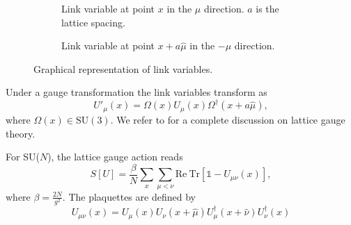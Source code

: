 \documentclass[12pt,a4paper]{article}
\begin{document}
\begin{figure}
\begin{center}
\begin{subfigure}{0.45\textwidth}
	\begin{center}
	\end{center}
	\caption{Link variable at point $x$ in the $\mu$ direction. $a$ is the lattice spacing.}
	\label{fig:link}
\end{subfigure}
\begin{subfigure}{0.45\textwidth}
	\begin{center}
	\end{center}
	\caption{Link variable at point $x+a\hat\mu$ in the $-\mu$ direction.}
	\label{fig:conjg_link}
\end{subfigure}
\end{center}
\caption{Graphical representation of link variables.}
\end{figure}

Under a gauge transformation the link variables transform as
\begin{equation}
	U'_{\mu}(x) = \Omega(x) U_{\mu}(x) \Omega^{\dagger}(x+a\hat\mu),
\end{equation}
where $\Omega(x)\in\text{SU}(3)$. We refer to \cite{gattringer} for a complete discussion on lattice gauge theory.



For SU($N$), the lattice gauge action reads
\begin{equation}
	\label{eq:wilson_action}
	S[U] = \frac{\beta}{N}\sum_x \sum_{\mu < \nu} \text{Re}\ \text{Tr} \left[\mathds{1} - U_{\mu\nu}(x) \right],
\end{equation}
where $\beta = \frac{2N}{g^2}$. The plaquettes are defined by
\begin{equation}
	\label{eq:plaquette}
	U_{\mu\nu}(x) = U_{\mu}(x)U_{\nu}(x+\hat{\mu})U_{\mu}^{\dagger}(x+\hat{\nu})U_{\nu}^{\dagger}(x) 
\end{equation}
\end{document}
